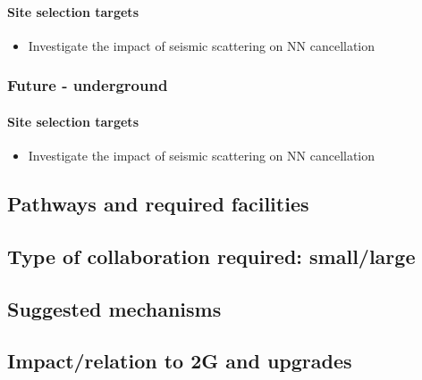 \paragraph{Site selection targets}
\begin{itemize}
\item Investigate the impact of seismic scattering on NN cancellation
\end{itemize}

\subsubsection{Future - underground}
\paragraph{Site selection targets}
\begin{itemize}
\item Investigate the impact of seismic scattering on NN cancellation
\end{itemize}

\subsection{Pathways and required facilities}
\subsection{Type of collaboration required:  small/large}
\subsection{Suggested mechanisms}
\subsection{Impact/relation to 2G and upgrades}